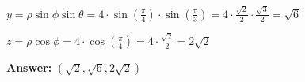 \documentclass[10pt]{article}                               %
\begin{document}
\begin{defaultbox}
\begin{adjustwidth}{2em}{0pt}
\begin{adjustwidth}{2em}{0pt}
\begin{examplebox}
\begin{adjustwidth}{2em}{0pt}
                        \( y = \rho\sin\phi\sin\theta = 4 \cdot \sin\left(\frac{\pi}{4}\right) \cdot \sin\left(\frac{\pi}{3}\right) = 4 \cdot \frac{\sqrt{2}}{2} \cdot \frac{\sqrt{3}}{2} = \sqrt{6} \)
    
                        \( z = \rho\cos\phi = 4 \cdot \cos\left(\frac{\pi}{4}\right) = 4 \cdot \frac{\sqrt{2}}{2} = 2\sqrt{2} \)
    
                        \textbf{Answer:} \( \left(\sqrt{2}, \sqrt{6}, 2\sqrt{2}\right) \)
    
                    \end{adjustwidth}
    
                \end{examplebox}

        \end{adjustwidth}

    \end{adjustwidth}

\end{defaultbox}
\end{document}
